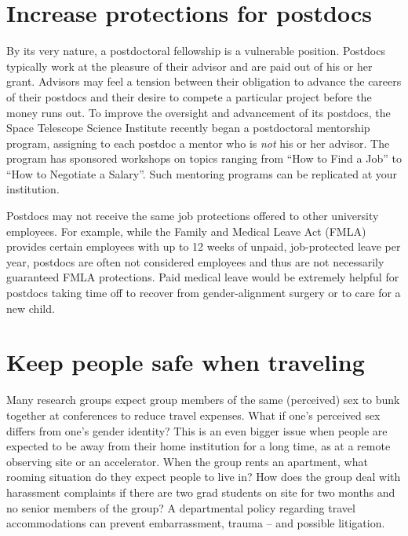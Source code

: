 \section {Increase protections for postdocs}
\label{post-docs}

By its very nature, a postdoctoral fellowship is a vulnerable position.  Postdocs typically work at the pleasure of their advisor and are paid out of his or her grant.  Advisors may feel a tension between their obligation to advance the careers of their postdocs and their desire to compete a particular project before the money runs out.  To improve the oversight and advancement of its postdocs, the Space Telescope Science Institute recently began a postdoctoral mentorship program, assigning to each postdoc a mentor who is \emph{not} his or her advisor.  The program has sponsored workshops on topics ranging from ``How to Find a Job'' to ``How to Negotiate a Salary''.  Such mentoring programs can be replicated at your institution.

Postdocs may not receive the same job protections offered to other university employees.  For example, while the Family and Medical Leave Act (FMLA) provides certain employees with up to 12 weeks of unpaid, job-protected leave per year, postdocs are often not considered employees and thus are not necessarily guaranteed FMLA protections.  Paid medical leave would be extremely helpful for postdocs taking time off to recover from gender-alignment surgery or to care for a new child.


\section {Keep people safe when traveling}
\label{accommodations}
Many research groups expect group members of the same (perceived) sex to bunk together at conferences to reduce travel expenses.  What if one's perceived sex differs from one's gender identity?  This is an even bigger issue when people are expected to be away from their home institution for a long time, as at a remote observing site or an accelerator. When the group rents an apartment, what rooming situation do they expect people to live in? How does the group deal with harassment complaints if there are two grad students on site for two months and no senior members of the group?  A departmental policy regarding travel accommodations can prevent embarrassment, trauma -- and possible litigation.















